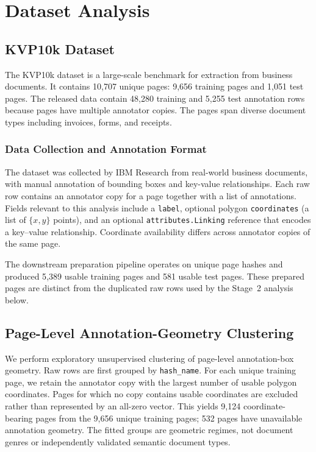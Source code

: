 \chapter{Dataset Analysis}
\label{ch:dataset}

\section{KVP10k Dataset}
\label{sec:kvp10k}

The KVP10k dataset \cite{kvp10k} is a large-scale benchmark for \kvp{} extraction from business documents. It contains 10,707 unique pages: 9,656 training pages and 1,051 test pages. The released data contain 48,280 training and 5,255 test annotation rows because pages have multiple annotator copies. The pages span diverse document types including invoices, forms, and receipts.

\subsection{Data Collection and Annotation Format}
The dataset was collected by IBM Research from real-world business documents, with manual annotation of bounding boxes and key-value relationships. Each raw row contains an annotator copy for a page together with a list of annotations. Fields relevant to this analysis include a \texttt{label}, optional polygon \texttt{coordinates} (a list of $\{x, y\}$ points), and an optional \texttt{attributes.Linking} reference that encodes a key--value relationship. Coordinate availability differs across annotator copies of the same page.

The downstream preparation pipeline operates on unique page hashes and produced 5{,}389 usable training pages and 581 usable test pages. These prepared pages are distinct from the duplicated raw rows used by the Stage~2 analysis below.

\section{Page-Level Annotation-Geometry Clustering}
\label{sec:layout_clustering}

We perform exploratory unsupervised clustering of page-level annotation-box geometry. Raw rows are first grouped by \texttt{hash\_name}. For each unique training page, we retain the annotator copy with the largest number of usable polygon coordinates. Pages for which no copy contains usable coordinates are excluded rather than represented by an all-zero vector. This yields 9{,}124 coordinate-bearing pages from the 9{,}656 unique training pages; 532 pages have unavailable annotation geometry. The fitted groups are geometric regimes, not document genres or independently validated semantic document types.

